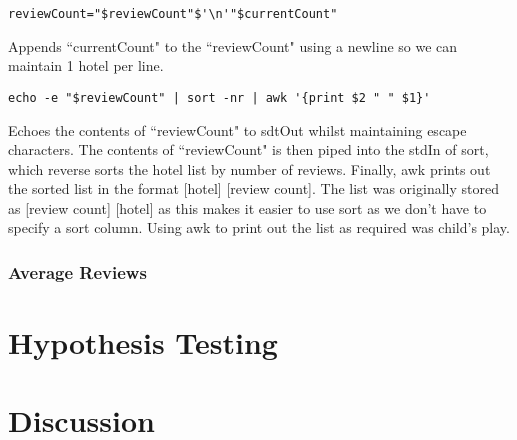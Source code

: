 \documentclass[a4paper]{article}
\begin{document}
\begin{lstlisting}
reviewCount="$reviewCount"$'\n'"$currentCount"
\end{lstlisting}
Appends ``currentCount" to the ``reviewCount" using a newline so we can maintain 1 hotel per line.

\begin{lstlisting}
echo -e "$reviewCount" | sort -nr | awk '{print $2 " " $1}'
\end{lstlisting}
Echoes the contents of ``reviewCount" to sdtOut whilst maintaining escape characters.
The contents of ``reviewCount" is then piped into the stdIn of sort, which reverse sorts the hotel list by number of reviews.
Finally, awk prints out the sorted list in the format [hotel] [review count].
The list was originally stored as [review count] [hotel] as this makes it easier to use sort as we don't have to specify a sort column.
Using awk to print out the list as required was child's play.

%
\newpage
\subsubsection{Average Reviews}


\newpage
\section{Hypothesis Testing}

\newpage
\section{Discussion}
\end{document}
